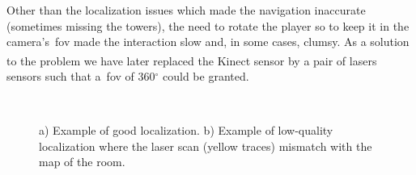 Other than the localization issues which made the navigation inaccurate (sometimes missing the towers), the need to rotate the player so to keep it in the camera's~\gls{fov} made the interaction slow and, in some cases, clumsy. As a solution to the problem we have later replaced the Kinect\textsuperscript{\textregistered} sensor by a pair of lasers sensors such that a~\gls{fov} of 360$^\circ$ could be granted.

\begin{figure}
    \centering 
    \begin{subfigure}[h]{0.49\columnwidth}
        \centering 
        \caption{}
    \end{subfigure}
    ~
    \begin{subfigure}[h]{0.49\columnwidth}
        \centering 
        \caption{}
        \label{fig:laser_map_mismatch}
    \end{subfigure}
    \caption{a) Example of good localization. b) Example of low-quality localization where the laser scan (yellow traces) mismatch with the map of the room.}
    \label{fig:maps}
\end{figure}

